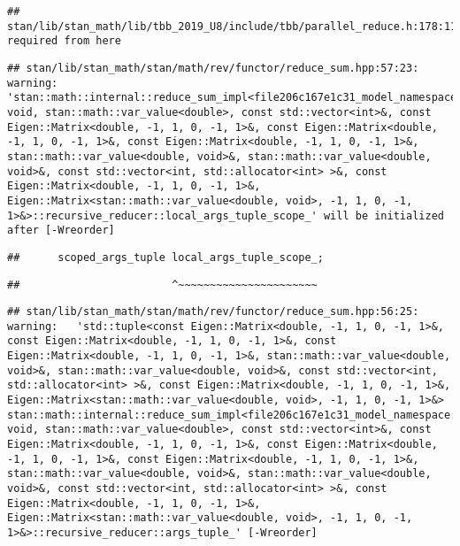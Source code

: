 \documentclass[
]{article}
\begin{document}
\begin{verbatim}
## stan/lib/stan_math/lib/tbb_2019_U8/include/tbb/parallel_reduce.h:178:11:   required from here
\end{verbatim}

\begin{verbatim}
## stan/lib/stan_math/stan/math/rev/functor/reduce_sum.hpp:57:23: warning: 'stan::math::internal::reduce_sum_impl<file206c167e1c31_model_namespace::partial_log_lik_rsfunctor__, void, stan::math::var_value<double>, const std::vector<int>&, const Eigen::Matrix<double, -1, 1, 0, -1, 1>&, const Eigen::Matrix<double, -1, 1, 0, -1, 1>&, const Eigen::Matrix<double, -1, 1, 0, -1, 1>&, stan::math::var_value<double, void>&, stan::math::var_value<double, void>&, const std::vector<int, std::allocator<int> >&, const Eigen::Matrix<double, -1, 1, 0, -1, 1>&, Eigen::Matrix<stan::math::var_value<double, void>, -1, 1, 0, -1, 1>&>::recursive_reducer::local_args_tuple_scope_' will be initialized after [-Wreorder]
\end{verbatim}

\begin{verbatim}
##      scoped_args_tuple local_args_tuple_scope_;
\end{verbatim}

\begin{verbatim}
##                        ^~~~~~~~~~~~~~~~~~~~~~~
\end{verbatim}

\begin{verbatim}
## stan/lib/stan_math/stan/math/rev/functor/reduce_sum.hpp:56:25: warning:   'std::tuple<const Eigen::Matrix<double, -1, 1, 0, -1, 1>&, const Eigen::Matrix<double, -1, 1, 0, -1, 1>&, const Eigen::Matrix<double, -1, 1, 0, -1, 1>&, stan::math::var_value<double, void>&, stan::math::var_value<double, void>&, const std::vector<int, std::allocator<int> >&, const Eigen::Matrix<double, -1, 1, 0, -1, 1>&, Eigen::Matrix<stan::math::var_value<double, void>, -1, 1, 0, -1, 1>&> stan::math::internal::reduce_sum_impl<file206c167e1c31_model_namespace::partial_log_lik_rsfunctor__, void, stan::math::var_value<double>, const std::vector<int>&, const Eigen::Matrix<double, -1, 1, 0, -1, 1>&, const Eigen::Matrix<double, -1, 1, 0, -1, 1>&, const Eigen::Matrix<double, -1, 1, 0, -1, 1>&, stan::math::var_value<double, void>&, stan::math::var_value<double, void>&, const std::vector<int, std::allocator<int> >&, const Eigen::Matrix<double, -1, 1, 0, -1, 1>&, Eigen::Matrix<stan::math::var_value<double, void>, -1, 1, 0, -1, 1>&>::recursive_reducer::args_tuple_' [-Wreorder]
\end{verbatim}
\end{document}
